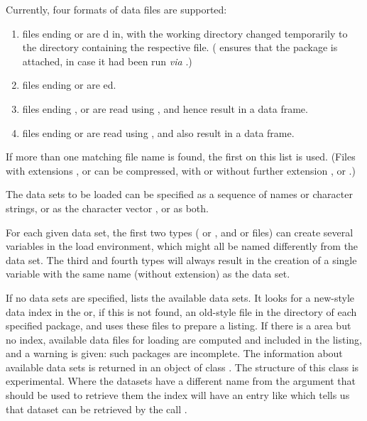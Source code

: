\begin{Details}\relax
Currently, four formats of data files are supported:

\begin{enumerate}

\item files ending  or  are
d in, with the \R{} working directory changed
temporarily to the directory containing the respective file.
( ensures that the  package is attached, in
case it had been run \emph{via} .)

\item files ending  or  are
ed.

\item files ending ,  or  are read
using , and hence
result in a data frame.

\item files ending  or  are read using
,
and also result in a data frame.

\end{enumerate}

If more than one matching file name is found, the first on this list
is used.  (Files with extensions ,  or
 can be compressed, with or without further extension
,  or .)

The data sets to be loaded can be specified as a sequence of names or
character strings, or as the character vector , or as both.

For each given data set, the first two types ( or ,
and  or  files) can create several variables
in the load environment, which might all be named differently from the
data set.  The third and fourth types will always result in the
creation of a single variable with the same name (without extension)
as the data set.

If no data sets are specified,  lists the available data
sets.  It looks for a new-style data index in the  or, if
this is not found, an old-style  file in the 
directory of each specified package, and uses these files to prepare a
listing.  If there is a  area but no index, available data
files for loading are computed and included in the listing, and a
warning is given: such packages are incomplete.  The information about
available data sets is returned in an object of class
.  The structure of this class is experimental.
Where the datasets have a different name from the argument that should
be used to retrieve them the index will have an entry like
 which tells us that dataset 
can be retrieved by the call .


\end{Details}
